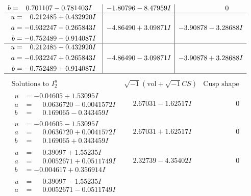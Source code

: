 \documentclass[1p]{elsarticle_modified}
\theoremstyle{definition}
\newcommand{\I}{\sqrt{-1}}
\begin{document}
$$\begin{array}{c|c|c}
\begin{aligned}
b &= \phantom{-}0.701107 - 0.781403 I\end{aligned}
 & -1.80796 - 8.47959 I & \phantom{-0.000000 } 0 \\ \hline\begin{aligned}
u &= \phantom{-}0.212485 + 0.432920 I \\
a &= -0.932247 - 0.265843 I \\
b &= -0.752489 - 0.914087 I\end{aligned}
 & -4.86490 + 3.09871 I & -3.90878 - 3.28688 I \\ \hline\begin{aligned}
u &= \phantom{-}0.212485 - 0.432920 I \\
a &= -0.932247 + 0.265843 I \\
b &= -0.752489 + 0.914087 I\end{aligned}
 & -4.86490 - 3.09871 I & -3.90878 + 3.28688 I\\
 \hline 
 \end{array}$$\newpage$$\begin{array}{c|c|c}  
\text{Solutions to }I^u_{2}& \I (\text{vol} + \sqrt{-1}CS) & \text{Cusp shape}\\
 \hline 
\begin{aligned}
u &= -0.04605 + 1.53095 I \\
a &= \phantom{-}0.0636720 - 0.0041572 I \\
b &= \phantom{-}0.169065 - 0.343459 I\end{aligned}
 & \phantom{-}2.67031 - 1.62517 I & \phantom{-0.000000 } 0 \\ \hline\begin{aligned}
u &= -0.04605 - 1.53095 I \\
a &= \phantom{-}0.0636720 + 0.0041572 I \\
b &= \phantom{-}0.169065 + 0.343459 I\end{aligned}
 & \phantom{-}2.67031 + 1.62517 I & \phantom{-0.000000 } 0 \\ \hline\begin{aligned}
u &= \phantom{-}0.39097 + 1.55235 I \\
a &= \phantom{-}0.0052671 + 0.0511749 I \\
b &= -0.004617 + 0.356914 I\end{aligned}
 & \phantom{-}2.32739 - 4.35402 I & \phantom{-0.000000 } 0 \\ \hline\begin{aligned}
u &= \phantom{-}0.39097 - 1.55235 I \\
a &= \phantom{-}0.0052671 - 0.0511749 I \\

\end{aligned}
\end{array}$$
\end{document}
